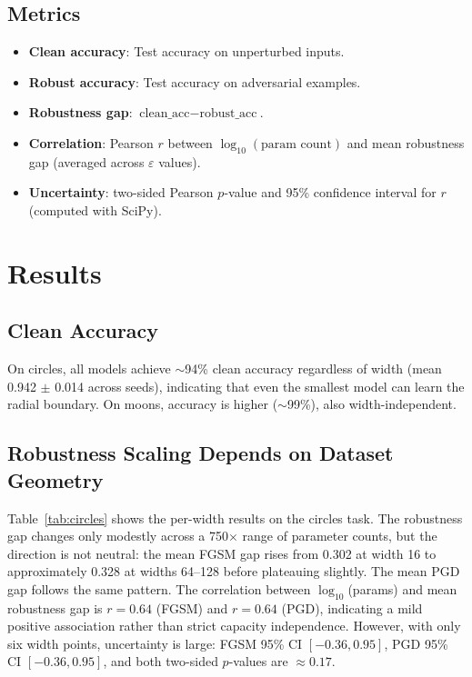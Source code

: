 \documentclass[11pt,a4paper]{article}
\begin{document}
\subsection{Metrics}

\begin{itemize}
    \item \textbf{Clean accuracy}: Test accuracy on unperturbed inputs.
    \item \textbf{Robust accuracy}: Test accuracy on adversarial examples.
    \item \textbf{Robustness gap}: $\text{clean\_acc} - \text{robust\_acc}$.
    \item \textbf{Correlation}: Pearson $r$ between $\log_{10}(\text{param count})$
          and mean robustness gap (averaged across $\varepsilon$ values).
    \item \textbf{Uncertainty}: two-sided Pearson $p$-value and 95\% confidence interval
          for $r$ (computed with SciPy).
\end{itemize}

\section{Results}

\subsection{Clean Accuracy}

On circles, all models achieve $\sim$94\% clean accuracy regardless of width
(mean 0.942 $\pm$ 0.014 across seeds), indicating that even the smallest model
can learn the radial boundary.
On moons, accuracy is higher ($\sim$99\%), also width-independent.

\subsection{Robustness Scaling Depends on Dataset Geometry}

Table~\ref{tab:circles} shows the per-width results on the circles task.
The robustness gap changes only modestly across a 750$\times$ range of parameter counts,
but the direction is not neutral: the mean FGSM gap rises from 0.302 at width 16
to approximately 0.328 at widths 64--128 before plateauing slightly.
The mean PGD gap follows the same pattern.
The correlation between $\log_{10}$(params) and mean robustness gap is
$r = 0.64$ (FGSM) and $r = 0.64$ (PGD), indicating a mild positive association
rather than strict capacity independence.
However, with only six width points, uncertainty is large:
FGSM 95\% CI $[-0.36, 0.95]$, PGD 95\% CI $[-0.36, 0.95]$,
and both two-sided $p$-values are $\approx 0.17$.
\end{document}
